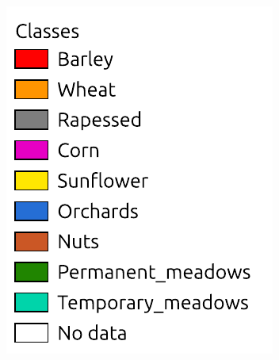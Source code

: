 \documentclass[journal,article,submit,pdftex,moreauthors]{Definitions/mdpi}
\begin{document}
\begin{figure}[H]
\begin{subfigure}[t]{0.35\linewidth}
	\caption{}
	\label{fig:test_aoi_pixel-wise}
    \vspace*{2mm}
	\end{subfigure}
    \begin{subfigure}[t]{0.15\linewidth}
    \includegraphics[width=\textwidth]{figures/aes_1_layer_mse_results/labels.pdf}
	\end{subfigure}\\
    \begin{subfigure}[t]{0.35\linewidth}

\end{subfigure}
\end{figure}
\end{document}
